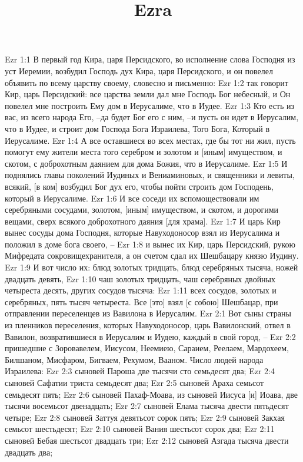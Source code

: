 

\title{Ezra}

Ezr 1:1  В первый год Кира, царя Персидского, во исполнение слова Господня из уст Иеремии, возбудил Господь дух Кира, царя Персидского, и он повелел объявить по всему царству своему, словесно и письменно:
Ezr 1:2  так говорит Кир, царь Персидский: все царства земли дал мне Господь Бог небесный, и Он повелел мне построить Ему дом в Иерусалиме, что в Иудее.
Ezr 1:3  Кто есть из вас, из всего народа Его, --да будет Бог его с ним, --и пусть он идет в Иерусалим, что в Иудее, и строит дом Господа Бога Израилева, Того Бога, Который в Иерусалиме.
Ezr 1:4  А все оставшиеся во всех местах, где бы тот ни жил, пусть помогут ему жители места того серебром и золотом и [иным] имуществом, и скотом, с доброхотным даянием для дома Божия, что в Иерусалиме.
Ezr 1:5  И поднялись главы поколений Иудиных и Вениаминовых, и священники и левиты, всякий, [в ком] возбудил Бог дух его, чтобы пойти строить дом Господень, который в Иерусалиме.
Ezr 1:6  И все соседи их вспомоществовали им серебряными сосудами, золотом, [иным] имуществом, и скотом, и дорогими вещами, сверх всякого доброхотного даяния [для храма].
Ezr 1:7  И царь Кир вынес сосуды дома Господня, которые Навуходоносор взял из Иерусалима и положил в доме бога своего, --
Ezr 1:8  и вынес их Кир, царь Персидский, рукою Мифредата сокровищехранителя, а он счетом сдал их Шешбацару князю Иудину.
Ezr 1:9  И вот число их: блюд золотых тридцать, блюд серебряных тысяча, ножей двадцать девять,
Ezr 1:10  чаш золотых тридцать, чаш серебряных двойных четыреста десять, других сосудов тысяча:
Ezr 1:11  всех сосудов, золотых и серебряных, пять тысяч четыреста. Все [это] взял [с собою] Шешбацар, при отправлении переселенцев из Вавилона в Иерусалим.
Ezr 2:1  Вот сыны страны из пленников переселения, которых Навуходоносор, царь Вавилонский, отвел в Вавилон, возвратившиеся в Иерусалим и Иудею, каждый в свой город, --
Ezr 2:2  пришедшие с Зоровавелем, Иисусом, Неемиею, Сараием, Реелаем, Мардохеем, Билшаном, Мисфаром, Бигваем, Рехумом, Вааном. Число людей народа Израилева:
Ezr 2:3  сыновей Пароша две тысячи сто семьдесят два;
Ezr 2:4  сыновей Сафатии триста семьдесят два;
Ezr 2:5  сыновей Араха семьсот семьдесят пять;
Ezr 2:6  сыновей Пахаф-Моава, из сыновей Иисуса [и] Иоава, две тысячи восемьсот двенадцать;
Ezr 2:7  сыновей Елама тысяча двести пятьдесят четыре;
Ezr 2:8  сыновей Заттуя девятьсот сорок пять;
Ezr 2:9  сыновей Закхая семьсот шестьдесят;
Ezr 2:10  сыновей Вания шестьсот сорок два;
Ezr 2:11  сыновей Бебая шестьсот двадцать три;
Ezr 2:12  сыновей Азгада тысяча двести двадцать два;
